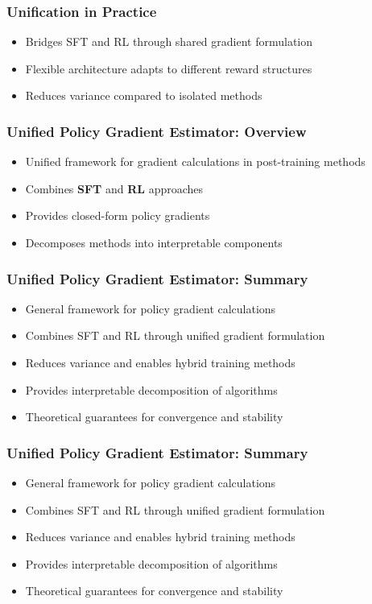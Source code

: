 \begin{frame}
\frametitle{Unification in Practice}
\begin{itemize}
  \item Bridges SFT and RL through shared gradient formulation
  \item Flexible architecture adapts to different reward structures
  \item Reduces variance compared to isolated methods
\end{itemize}
\end{frame}%
\begin{frame}
\frametitle{Unified Policy Gradient Estimator: Overview}
\begin{itemize}
  \item Unified framework for gradient calculations in post-training methods
  \item Combines \textbf{SFT} and \textbf{RL} approaches
  \item Provides closed-form policy gradients
  \item Decomposes methods into interpretable components
\end{itemize}
\end{frame}%
\begin{frame}
\frametitle{Unified Policy Gradient Estimator: Summary}
\begin{itemize}
  \item General framework for policy gradient calculations
  \item Combines SFT and RL through unified gradient formulation
  \item Reduces variance and enables hybrid training methods
  \item Provides interpretable decomposition of algorithms
  \item Theoretical guarantees for convergence and stability
\end{itemize}
\end{frame}%
\begin{frame}
\frametitle{Unified Policy Gradient Estimator: Summary}
\begin{itemize}
  \item General framework for policy gradient calculations
  \item Combines SFT and RL through unified gradient formulation
  \item Reduces variance and enables hybrid training methods
  \item Provides interpretable decomposition of algorithms
  \item Theoretical guarantees for convergence and stability
\end{itemize}
\end{frame}%
